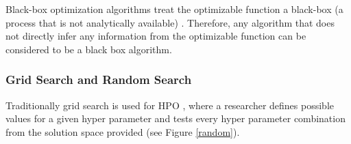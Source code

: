 \documentclass[runningheads]{llncs}
\begin{document}
Black-box optimization algorithms treat the optimizable function a black-box (a process that is not analytically available) \cite[ch.~1]{book}. Therefore, any algorithm that does not directly infer any information from the optimizable function can be considered to be a black box algorithm.

\subsubsection{Grid Search and Random Search}

Traditionally grid search is used for HPO \cite{liashchynskyi2019grid}, where a researcher defines possible values for a given hyper parameter and tests every hyper parameter combination from the solution space provided (see Figure \ref{random}).
\end{document}
